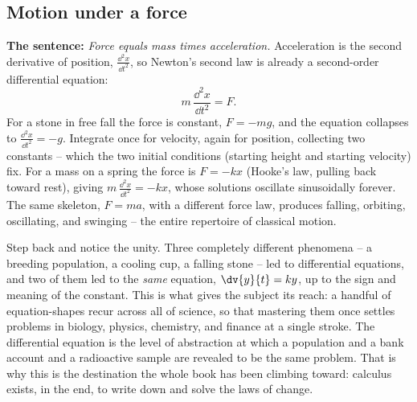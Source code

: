 \subsection{Motion under a force}

\begin{applicationbox}
\textbf{The sentence:} \emph{Force equals mass times acceleration.} Acceleration is the second derivative of position, $\frac{\dd^2 x}{\dd t^2}$, so Newton's second law is already a second-order differential equation:
\[
  m\,\frac{\dd^2 x}{\dd t^2} = F.
\]
For a stone in free fall the force is constant, $F = -mg$, and the equation collapses to $\frac{\dd^2 x}{\dd t^2} = -g$. Integrate once for velocity, again for position, collecting two constants -- which the two initial conditions (starting height and starting velocity) fix. For a mass on a spring the force is $F = -kx$ (Hooke's law, pulling back toward rest), giving $m\,\frac{\dd^2 x}{\dd t^2} = -kx$, whose solutions oscillate sinusoidally forever. The same skeleton, $F = ma$, with a different force law, produces falling, orbiting, oscillating, and swinging -- the entire repertoire of classical motion.
\end{applicationbox}

\begin{aestheticbox}
Step back and notice the unity. Three completely different phenomena -- a breeding population, a cooling cup, a falling stone -- led to differential equations, and two of them led to the \emph{same} equation, $\dv{y}{t} = ky$, up to the sign and meaning of the constant. This is what gives the subject its reach: a handful of equation-shapes recur across all of science, so that mastering them once settles problems in biology, physics, chemistry, and finance at a single stroke. The differential equation is the level of abstraction at which a population and a bank account and a radioactive sample are revealed to be the same problem. That is why this is the destination the whole book has been climbing toward: calculus exists, in the end, to write down and solve the laws of change.
\end{aestheticbox}

